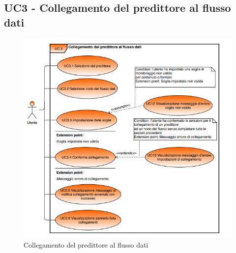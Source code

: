 
	\label{par:UC3}
	\subsection{UC3 - Collegamento del predittore al flusso dati}

		\begin{figure}[H]
		\centering
		\includegraphics[scale=0.70]{../Analisi_dei_requisiti/img/Diagrammi_UML/UC3_collegamento_flusso_dati.png}
		\caption{Collegamento del predittore al flusso dati}
		\end{figure}	

